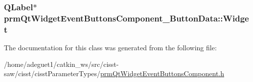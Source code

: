 \hypertarget{classprm_qt_widget_event_buttons_component___button_data_a494181775f0be5959a4cb2a4f4e71288}{
\subsubsection[{Widget}]{\setlength{\rightskip}{0pt plus 5cm}Q\-Label$\ast$ prm\-Qt\-Widget\-Event\-Buttons\-Component\-\_\-\-Button\-Data\-::\-Widget}}\label{classprm_qt_widget_event_buttons_component___button_data_a494181775f0be5959a4cb2a4f4e71288}


The documentation for this class was generated from the following file\-:\begin{DoxyCompactItemize}
\item 
/home/adeguet1/catkin\-\_\-ws/src/cisst-\/saw/cisst/cisst\-Parameter\-Types/\hyperlink{prm_qt_widget_event_buttons_component_8h}{prm\-Qt\-Widget\-Event\-Buttons\-Component.\-h}\end{DoxyCompactItemize}
